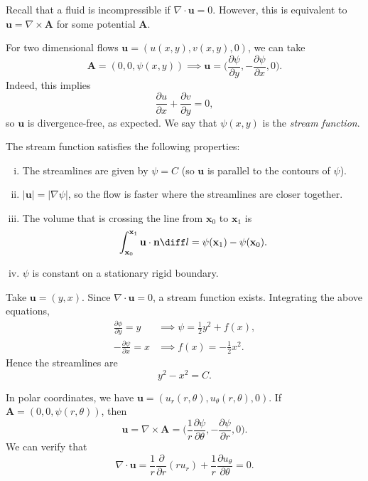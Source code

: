\documentclass[12pt]{article}
\begin{document}
Recall that a fluid is incompressible if $\nabla \cdot \mathbf{u} = 0$. However, this is equivalent to $\mathbf{u} = \nabla \times \mathbf{A}$ for some potential $\mathbf{A}$.

For two dimensional flows $\mathbf{u} = (u(x,y),v(x,y),0)$, we can take
\[
\mathbf{A} = (0, 0, \psi(x, y)) \implies \mathbf{u} = \biggl( \frac{\partial \psi}{\partial y}, - \frac{\partial \psi}{\partial x}, 0 \biggr)
.\]
Indeed, this implies
\[
\frac{\partial u}{\partial x} + \frac{\partial v}{\partial y} = 0
,\] 
so $\mathbf{u}$ is divergence-free, as expected. We say that $\psi(x, y)$ is the \emph{stream function}.

The stream function satisfies the following properties:
\begin{enumerate}[(i)]
	\item The streamlines are given by $\psi = C$ (so $\mathbf{u}$ is parallel to the contours of $\psi$).
	\item $|\mathbf{u}| = |\nabla \psi|$, so the flow is faster where the streamlines are closer together.
	\item The volume that is crossing the line from $\mathbf{x}_0$ to $\mathbf{x}_1$ is
		\[
		\int_{\mathbf{x}_0}^{\mathbf{x}_1} \mathbf{u} \cdot \mathbf{n} \diff l = \psi(\mathbf{x}_1) - \psi(\mathbf{x}_0)
		.\]
	\item $\psi$ is constant on a stationary rigid boundary.
\end{enumerate}

\begin{exbox}
	Take $\mathbf{u} = (y, x)$. Since $\nabla \cdot \mathbf{u} = 0$, a stream function exists. Integrating the above equations,
	\begin{align*}
		\frac{\partial \phi}{\partial y} = y &\implies \psi = \frac{1}{2} y^2 + f(x), \\
		-\frac{\partial \psi}{\partial x} = x &\implies f(x) = -\frac{1}{2}x^2.
	\end{align*}
	Hence the streamlines are
	\[
		y^2 - x^2 = C
	.\]
\end{exbox}

In polar coordinates, we have $\mathbf{u} = (u_r(r, \theta), u_\theta(r, \theta), 0)$. If $\mathbf{A} = (0, 0, \psi(r, \theta))$, then
\[
\mathbf{u} = \nabla \times \mathbf{A} = \biggl( \frac{1}{r} \frac{\partial \psi}{\partial \theta}, - \frac{\partial \psi}{\partial r}, 0 \biggr)
.\]
We can verify that
\[
\nabla \cdot \mathbf{u} = \frac{1}{r} \frac{\partial}{\partial r} (r u_r) + \frac{1}{r} \frac{\partial u_{\theta}}{\partial \theta} = 0
.\]
\end{document}
